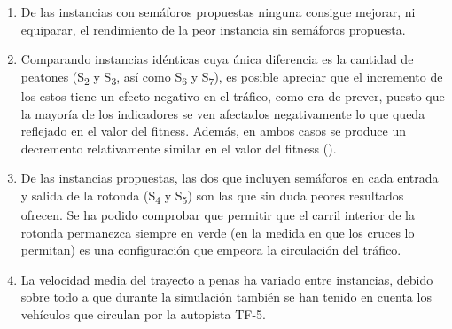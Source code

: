\begin{enumerate}
    \item De las instancias con semáforos propuestas ninguna consigue mejorar, ni equiparar, el rendimiento de la peor instancia sin semáforos propuesta.
    \item  Comparando instancias idénticas cuya única diferencia es la cantidad de peatones (S\textsubscript{2} y S\textsubscript{3}, así como S\textsubscript{6} y S\textsubscript{7}), es posible apreciar que el incremento de los estos tiene un efecto negativo en el tráfico, como era de prever, puesto que la mayoría de los indicadores se ven afectados negativamente lo que queda reflejado en el valor del fitness. Además, en ambos casos se produce un decremento relativamente similar en el valor del fitness ().
    \item De las instancias propuestas, las dos que incluyen semáforos en cada entrada y salida de la rotonda (S\textsubscript{4} y S\textsubscript{5}) son las que sin duda peores resultados ofrecen. Se ha podido comprobar que permitir que el carril interior de la rotonda permanezca siempre en verde (en la medida en que los cruces lo permitan) es una configuración que empeora la circulación del tráfico.
    \item La velocidad media del trayecto a penas ha variado entre instancias, debido sobre todo a que durante la simulación también se han tenido en cuenta los vehículos que circulan por la autopista TF-5.
\end{enumerate}